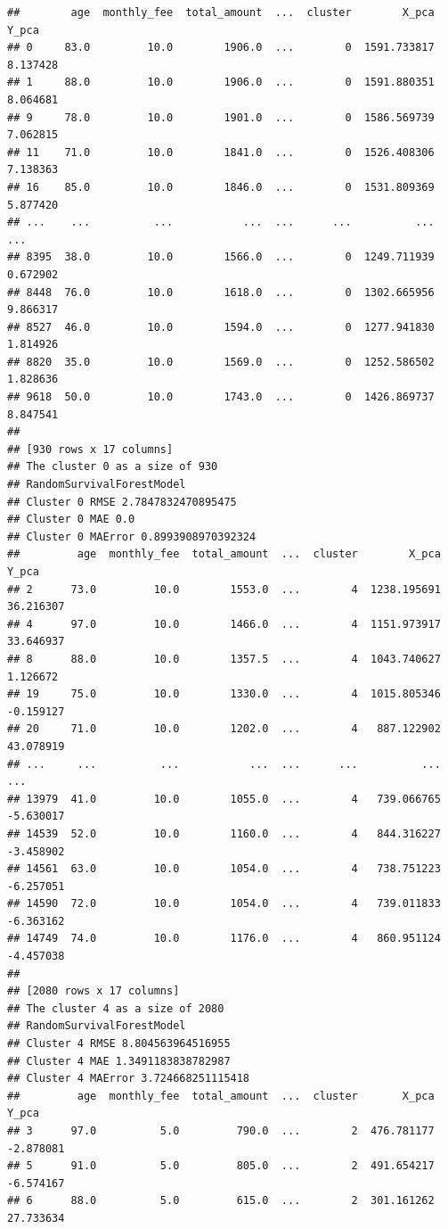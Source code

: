 \documentclass[
  12pt,
]{article}
\begin{document}
\begin{verbatim}
##        age  monthly_fee  total_amount  ...  cluster        X_pca     Y_pca
## 0     83.0         10.0        1906.0  ...        0  1591.733817  8.137428
## 1     88.0         10.0        1906.0  ...        0  1591.880351  8.064681
## 9     78.0         10.0        1901.0  ...        0  1586.569739  7.062815
## 11    71.0         10.0        1841.0  ...        0  1526.408306  7.138363
## 16    85.0         10.0        1846.0  ...        0  1531.809369  5.877420
## ...    ...          ...           ...  ...      ...          ...       ...
## 8395  38.0         10.0        1566.0  ...        0  1249.711939  0.672902
## 8448  76.0         10.0        1618.0  ...        0  1302.665956  9.866317
## 8527  46.0         10.0        1594.0  ...        0  1277.941830  1.814926
## 8820  35.0         10.0        1569.0  ...        0  1252.586502  1.828636
## 9618  50.0         10.0        1743.0  ...        0  1426.869737  8.847541
## 
## [930 rows x 17 columns]
## The cluster 0 as a size of 930
## RandomSurvivalForestModel
## Cluster 0 RMSE 2.7847832470895475
## Cluster 0 MAE 0.0
## Cluster 0 MAError 0.8993908970392324
##         age  monthly_fee  total_amount  ...  cluster        X_pca      Y_pca
## 2      73.0         10.0        1553.0  ...        4  1238.195691  36.216307
## 4      97.0         10.0        1466.0  ...        4  1151.973917  33.646937
## 8      88.0         10.0        1357.5  ...        4  1043.740627   1.126672
## 19     75.0         10.0        1330.0  ...        4  1015.805346  -0.159127
## 20     71.0         10.0        1202.0  ...        4   887.122902  43.078919
## ...     ...          ...           ...  ...      ...          ...        ...
## 13979  41.0         10.0        1055.0  ...        4   739.066765  -5.630017
## 14539  52.0         10.0        1160.0  ...        4   844.316227  -3.458902
## 14561  63.0         10.0        1054.0  ...        4   738.751223  -6.257051
## 14590  72.0         10.0        1054.0  ...        4   739.011833  -6.363162
## 14749  74.0         10.0        1176.0  ...        4   860.951124  -4.457038
## 
## [2080 rows x 17 columns]
## The cluster 4 as a size of 2080
## RandomSurvivalForestModel
## Cluster 4 RMSE 8.804563964516955
## Cluster 4 MAE 1.3491183838782987
## Cluster 4 MAError 3.724668251115418
##         age  monthly_fee  total_amount  ...  cluster       X_pca      Y_pca
## 3      97.0          5.0         790.0  ...        2  476.781177  -2.878081
## 5      91.0          5.0         805.0  ...        2  491.654217  -6.574167
## 6      88.0          5.0         615.0  ...        2  301.161262  27.733634

\end{verbatim}
\end{document}
